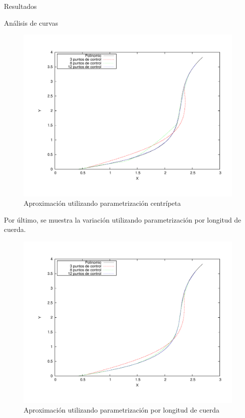 \begin{section}{Resultados}
\begin{subsection}{Análisis de curvas}
		\begin{figure}[H]
		  \centering
			\includegraphics[width=14cm]{graficos/centripetal_grafiquinSame.pdf}
		  \caption{Aproximación utilizando parametrización centrípeta}
		  \label{fig:centripetal}
		\end{figure}
		
		\VSP

		Por último, se muestra la variación utilizando parametrización por longitud de cuerda.

		\begin{figure}[H]
		  \centering
			\includegraphics[width=14cm]{graficos/chordLength_grafiquinSame.pdf}
		  \caption{Aproximación utilizando parametrización por longitud de cuerda}
		  \label{fig:chordLength}
		\end{figure}
		
		\VSP
	\end{subsection}
\end{section}
